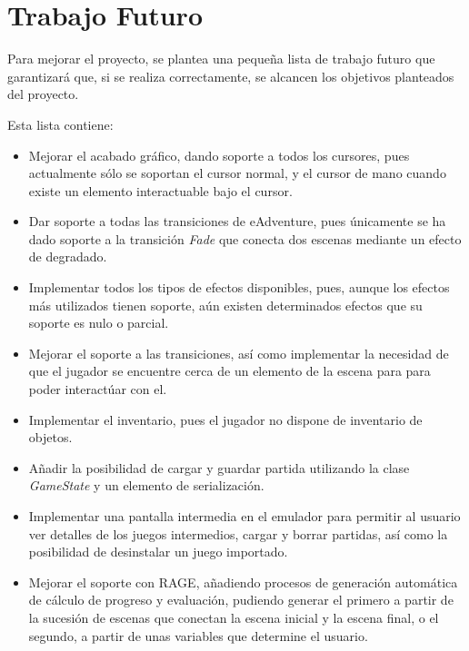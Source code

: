 \chapter{Trabajo Futuro}

Para mejorar el proyecto, se plantea una pequeña lista de trabajo futuro que garantizará que, si se realiza correctamente, se alcancen los objetivos planteados del proyecto.

Esta lista contiene:
\begin{itemize}
	\item Mejorar el acabado gráfico, dando soporte a todos los cursores, pues actualmente sólo se soportan el cursor normal, y el cursor de mano cuando existe un elemento interactuable bajo el cursor.
	
	\item Dar soporte a todas las transiciones de eAdventure, pues únicamente se ha dado soporte a la transición \textit{Fade} que conecta dos escenas mediante un efecto de degradado.
	
	\item Implementar todos los tipos de efectos disponibles, pues, aunque los efectos más utilizados tienen soporte, aún existen determinados efectos que su soporte es nulo o parcial.
	
	\item Mejorar el soporte a las transiciones, así como implementar la necesidad de que el jugador se encuentre cerca de un elemento de la escena para para poder interactúar con el.
	
	\item Implementar el inventario, pues el jugador no dispone de inventario de objetos.
	
	\item Añadir la posibilidad de cargar y guardar partida utilizando la clase \textit{GameState} y un elemento de serialización.
	
	\item Implementar una pantalla intermedia en el emulador para permitir al usuario ver detalles de los juegos intermedios, cargar y borrar partidas, así como la posibilidad de desinstalar un juego importado.
	
	\item Mejorar el soporte con RAGE, añadiendo procesos de generación automática de cálculo de progreso y evaluación, pudiendo generar el primero a partir de la sucesión de escenas que conectan la escena inicial y la escena final, o el segundo, a partir de unas variables que determine el usuario.
	

\end{itemize}
